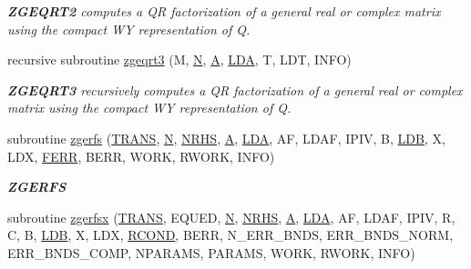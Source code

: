 \begin{DoxyCompactItemize}
\begin{DoxyCompactList}\small\item\em {\bfseries Z\+G\+E\+Q\+R\+T2} computes a Q\+R factorization of a general real or complex matrix using the compact W\+Y representation of Q. \end{DoxyCompactList}\item 
recursive subroutine \hyperlink{group__complex16GEcomputational_gafdc1b602bb1d2232ab128f5e15ead515}{zgeqrt3} (M, \hyperlink{polmisc_8c_a0240ac851181b84ac374872dc5434ee4}{N}, \hyperlink{classA}{A}, \hyperlink{example__user_8c_ae946da542ce0db94dced19b2ecefd1aa}{L\+D\+A}, T, L\+D\+T, I\+N\+F\+O)
\begin{DoxyCompactList}\small\item\em {\bfseries Z\+G\+E\+Q\+R\+T3} recursively computes a Q\+R factorization of a general real or complex matrix using the compact W\+Y representation of Q. \end{DoxyCompactList}\item 
subroutine \hyperlink{group__complex16GEcomputational_ga42986fd49f5f845a013fb66134ce7847}{zgerfs} (\hyperlink{superlu__enum__consts_8h_a0c4e17b2d5cea33f9991ccc6a6678d62a1f61e3015bfe0f0c2c3fda4c5a0cdf58}{T\+R\+A\+N\+S}, \hyperlink{polmisc_8c_a0240ac851181b84ac374872dc5434ee4}{N}, \hyperlink{example__user_8c_aa0138da002ce2a90360df2f521eb3198}{N\+R\+H\+S}, \hyperlink{classA}{A}, \hyperlink{example__user_8c_ae946da542ce0db94dced19b2ecefd1aa}{L\+D\+A}, A\+F, L\+D\+A\+F, I\+P\+I\+V, B, \hyperlink{example__user_8c_a50e90a7104df172b5a89a06c47fcca04}{L\+D\+B}, X, L\+D\+X, \hyperlink{superlu__enum__consts_8h_af00a42ecad444bbda75cde1b64bd7e72a78fd14d7abebae04095cfbe02928f153}{F\+E\+R\+R}, B\+E\+R\+R, W\+O\+R\+K, R\+W\+O\+R\+K, I\+N\+F\+O)
\begin{DoxyCompactList}\small\item\em {\bfseries Z\+G\+E\+R\+F\+S} \end{DoxyCompactList}\item 
subroutine \hyperlink{group__complex16GEcomputational_ga27a6dc0c11a5de56db8aac64619b7873}{zgerfsx} (\hyperlink{superlu__enum__consts_8h_a0c4e17b2d5cea33f9991ccc6a6678d62a1f61e3015bfe0f0c2c3fda4c5a0cdf58}{T\+R\+A\+N\+S}, E\+Q\+U\+E\+D, \hyperlink{polmisc_8c_a0240ac851181b84ac374872dc5434ee4}{N}, \hyperlink{example__user_8c_aa0138da002ce2a90360df2f521eb3198}{N\+R\+H\+S}, \hyperlink{classA}{A}, \hyperlink{example__user_8c_ae946da542ce0db94dced19b2ecefd1aa}{L\+D\+A}, A\+F, L\+D\+A\+F, I\+P\+I\+V, R, C, B, \hyperlink{example__user_8c_a50e90a7104df172b5a89a06c47fcca04}{L\+D\+B}, X, L\+D\+X, \hyperlink{superlu__enum__consts_8h_af00a42ecad444bbda75cde1b64bd7e72a9b5c151728d8512307565994c89919d5}{R\+C\+O\+N\+D}, B\+E\+R\+R, N\+\_\+\+E\+R\+R\+\_\+\+B\+N\+D\+S, E\+R\+R\+\_\+\+B\+N\+D\+S\+\_\+\+N\+O\+R\+M, E\+R\+R\+\_\+\+B\+N\+D\+S\+\_\+\+C\+O\+M\+P, N\+P\+A\+R\+A\+M\+S, P\+A\+R\+A\+M\+S, W\+O\+R\+K, R\+W\+O\+R\+K, I\+N\+F\+O)

\end{DoxyCompactItemize}
